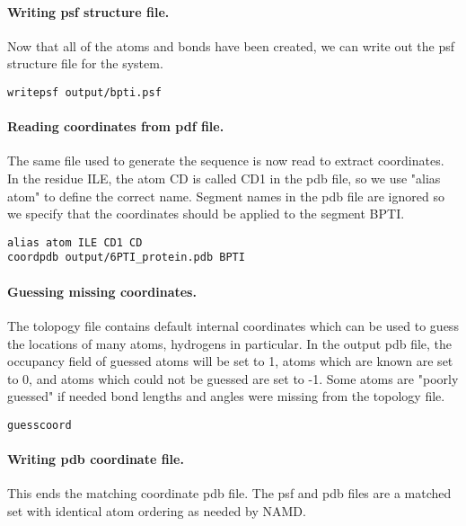 \paragraph*{Writing psf structure file.}


Now that all of the atoms and bonds have been created, we can write
out the psf structure file for the system.

\begin{verbatim}
writepsf output/bpti.psf
\end{verbatim}

\paragraph*{Reading coordinates from pdf file.}


The same file used to generate the sequence is now read to extract
coordinates.  In the residue ILE, the atom CD is called CD1 in the
pdb file, so we use "alias atom" to define the correct name.  Segment
names in the pdb file are ignored so we specify that the coordinates
should be applied to the segment BPTI.

\begin{verbatim}
alias atom ILE CD1 CD
coordpdb output/6PTI_protein.pdb BPTI
\end{verbatim}

\paragraph*{Guessing missing coordinates.}


The tolopogy file contains default internal coordinates which can be
used to guess the locations of many atoms, hydrogens in particular.
In the output pdb file, the occupancy field of guessed atoms will be
set to 1, atoms which are known are set to 0, and atoms which could
not be guessed are set to -1.  Some atoms are "poorly guessed" if
needed bond lengths and angles were missing from the topology file.

\begin{verbatim}
guesscoord
\end{verbatim}

\paragraph*{Writing pdb coordinate file.}


This ends the matching coordinate pdb file.  The psf and pdb files
are a matched set with identical atom ordering as needed by NAMD.

